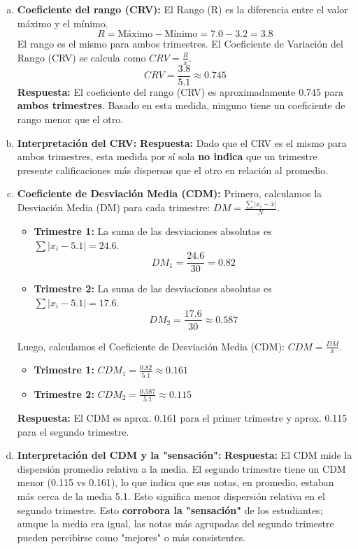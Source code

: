 \documentclass[10pt, a4paper]{article}
\newcommand{\mean}[1]{\ensuremath{\bar{#1}}} %
\begin{document}
\begin{enumerate}[a.]
    \item \textbf{Coeficiente del rango (CRV):}
    El Rango (R) es la diferencia entre el valor máximo y el mínimo.
    \[ R = \text{Máximo} - \text{Mínimo} = \num{7,0} - \num{3,2} = \num{3,8} \]
    El rango es el mismo para ambos trimestres.
    El Coeficiente de Variación del Rango (CRV) se calcula como $CRV = \frac{R}{\mean{x}}$.
    \[ CRV = \frac{\num{3,8}}{\num{5,1}} \approx \num{0,745} \]
    \textbf{Respuesta:} El coeficiente del rango (CRV) es aproximadamente \num{0,745} para \textbf{ambos trimestres}. Basado en esta medida, ninguno tiene un coeficiente de rango menor que el otro.

    \item \textbf{Interpretación del CRV:}
    \textbf{Respuesta:} Dado que el CRV es el mismo para ambos trimestres, esta medida por sí sola \textbf{no indica} que un trimestre presente calificaciones más dispersas que el otro en relación al promedio.

    \item \textbf{Coeficiente de Desviación Media (CDM):}
    Primero, calculamos la Desviación Media (DM) para cada trimestre: $DM = \frac{\sum |x_i - \mean{x}|}{N}$.
    \begin{itemize}[nosep]
        \item \textbf{Trimestre 1:} La suma de las desviaciones absolutas es $\sum |x_i - \num{5,1}| = \num{24,6}$.
          \[ DM_1 = \frac{\num{24,6}}{30} = \num{0,82} \]
        \item \textbf{Trimestre 2:} La suma de las desviaciones absolutas es $\sum |x_i - \num{5,1}| = \num{17,6}$.
          \[ DM_2 = \frac{\num{17,6}}{30} \approx \num{0,587} \]
    \end{itemize}
    Luego, calculamos el Coeficiente de Desviación Media (CDM): $CDM = \frac{DM}{\mean{x}}$.
    \begin{itemize}[nosep]
        \item \textbf{Trimestre 1:} $CDM_1 = \frac{\num{0,82}}{\num{5,1}} \approx \num{0,161}$
        \item \textbf{Trimestre 2:} $CDM_2 = \frac{\num{0,587}}{\num{5,1}} \approx \num{0,115}$
    \end{itemize}
    \textbf{Respuesta:} El CDM es aprox. \num{0,161} para el primer trimestre y aprox. \num{0,115} para el segundo trimestre.

    \item \textbf{Interpretación del CDM y la "sensación":}
    \textbf{Respuesta:} El CDM mide la dispersión promedio relativa a la media. El segundo trimestre tiene un CDM menor (\num{0,115} vs \num{0,161}), lo que indica que sus notas, en promedio, estaban más cerca de la media \num{5,1}. Esto significa menor dispersión relativa en el segundo trimestre. Esto \textbf{corrobora la "sensación"} de los estudiantes; aunque la media era igual, las notas más agrupadas del segundo trimestre pueden percibirse como "mejores" o más consistentes.


\end{enumerate}
\end{document}
